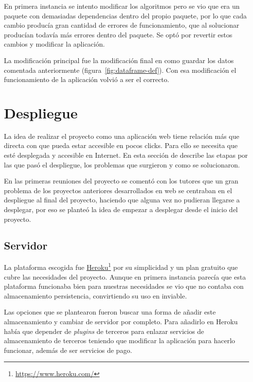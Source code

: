 En primera instancia se intento modificar los algoritmos pero se vio que era un
paquete con demasiadas dependencias dentro del propio paquete, por lo que cada
cambio producía gran cantidad de errores de funcionamiento, que al solucionar
producían todavía más errores dentro del paquete. Se optó por revertir estos
cambios y modificar la aplicación.

La modificación principal fue la modificación final en como guardar los datos
comentada anteriormente (figura~\ref{fig:dataframe-def}). Con esa modificación
el funcionamiento de la aplicación volvió a ser el correcto.

\section{Despliegue}\label{sec:despliegue}

La idea de realizar el proyecto como una aplicación web tiene relación más que
directa con que pueda estar accesible en pocos clicks. Para ello se necesita que
esté desplegada y accesible en Internet. En esta sección de describe las etapas
por las que pasó el despliegue, los problemas que surgieron y como se
solucionaron.

En las primeras reuniones del proyecto se comentó con los tutores que un gran
problema de los proyectos anteriores desarrollados en web se centraban en el
despliegue al final del proyecto, haciendo que alguna vez no pudieran llegarse a
desplegar, por eso se planteó la idea de empezar a desplegar desde el inicio del
proyecto.

\subsection{Servidor}

La plataforma escogida fue
\href{https://www.heroku.com/}{Heroku}\footnote{\url{https://www.heroku.com/}}
por su simplicidad y un plan gratuito que cubre las necesidades del proyecto.
Aunque en primera instancia parecía que esta plataforma funcionaba bien para
nuestras necesidades se vio que no contaba con almacenamiento persistencia,
convirtiendo su uso en inviable.

Las opciones que se plantearon fueron buscar una forma de añadir este
almacenamiento y cambiar de servidor por completo. Para añadirlo en Heroku había
que depender de \textit{plugins} de terceros para enlazar servicios de
almacenamiento de terceros teniendo que modificar la aplicación para hacerlo
funcionar, además de ser servicios de pago.

